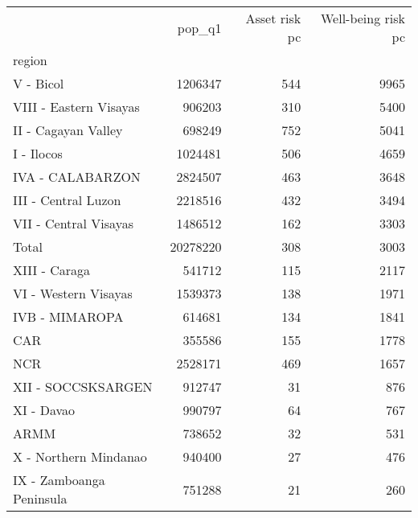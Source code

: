 \begin{tabular}{lrrr}
\toprule
{} &    pop\_q1 &  Asset risk pc &  Well-being risk pc \\
region                   &           &                &                     \\
\midrule
V - Bicol                &   1206347 &            544 &                9965 \\
VIII - Eastern Visayas   &    906203 &            310 &                5400 \\
II - Cagayan Valley      &    698249 &            752 &                5041 \\
I - Ilocos               &   1024481 &            506 &                4659 \\
IVA - CALABARZON         &   2824507 &            463 &                3648 \\
III - Central Luzon      &   2218516 &            432 &                3494 \\
VII - Central Visayas    &   1486512 &            162 &                3303 \\
Total                    &  20278220 &            308 &                3003 \\
XIII - Caraga            &    541712 &            115 &                2117 \\
VI - Western Visayas     &   1539373 &            138 &                1971 \\
IVB - MIMAROPA           &    614681 &            134 &                1841 \\
CAR                      &    355586 &            155 &                1778 \\
NCR                      &   2528171 &            469 &                1657 \\
XII - SOCCSKSARGEN       &    912747 &             31 &                 876 \\
XI - Davao               &    990797 &             64 &                 767 \\
ARMM                     &    738652 &             32 &                 531 \\
X - Northern Mindanao    &    940400 &             27 &                 476 \\
IX - Zamboanga Peninsula &    751288 &             21 &                 260 \\
\bottomrule
\end{tabular}
